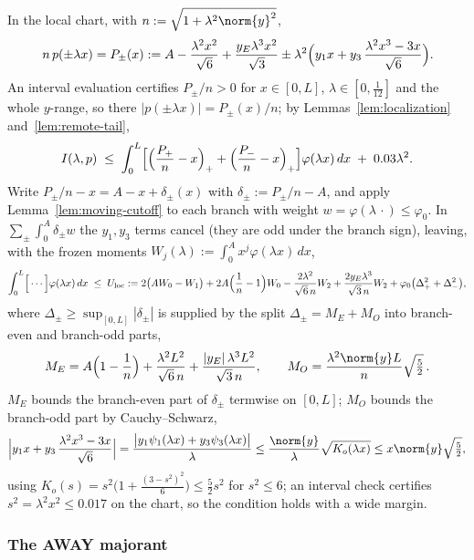 In the local chart, with $n:=\sqrt{1+\lambda^2\norm{y}^2}$,
\[
        n\,p(\pm\lambda x)=P_\pm(x)
        :=A-\frac{\lambda^2x^2}{\sqrt6}+\frac{y_E\lambda^3x^2}{\sqrt3}
        \pm\lambda^2\Bigl(y_1x+y_3\,\frac{\lambda^2x^3-3x}{\sqrt6}\Bigr).
\]
An interval evaluation certifies $P_\pm/n>0$ for $x\in[0,L]$, $\lambda\in[0,\tfrac1{12}]$ and the whole $y$-range, so there $|p(\pm\lambda x)|=P_\pm(x)/n$; by Lemmas~\ref{lem:localization} and~\ref{lem:remote-tail},
\begin{equation}
        I(\lambda,p)\;\le\;\int_0^L\Bigl[\Bigl(\frac{P_+}{n}-x\Bigr)_++\Bigl(\frac{P_-}{n}-x\Bigr)_+\Bigr]\varphi(\lambda x)\,dx
        \;+\;0.03\lambda^2 .
        \label{eq:reserve}
\end{equation}
Write $P_\pm/n-x=A-x+\delta_\pm(x)$ with $\delta_\pm:=P_\pm/n-A$, and apply Lemma~\ref{lem:moving-cutoff} to each branch with weight $w=\varphi(\lambda\,\cdot)\le\varphi_0$. In $\sum_\pm\int_0^A\delta_\pm w$ the $y_1,y_3$ terms cancel (they are odd under the branch sign), leaving, with the frozen moments $W_j(\lambda):=\int_0^Ax^j\varphi(\lambda x)\,dx$,
\[
        \int_0^L\Bigl[\,\cdots\Bigr]\varphi(\lambda x)\,dx
        \;\le\;U_{\mathrm{loc}}
        :=2\bigl(AW_0-W_1\bigr)+2A\Bigl(\frac1n-1\Bigr)W_0
        -\frac{2\lambda^2}{\sqrt6\,n}W_2+\frac{2y_E\lambda^3}{\sqrt3\,n}W_2
        +\varphi_0\bigl(\Delta_+^2+\Delta_-^2\bigr),
\]
where $\Delta_\pm\ge\sup_{[0,L]}|\delta_\pm|$ is supplied by the split $\Delta_\pm=M_E+M_O$ into branch-even and branch-odd parts,
\[
        M_E=A\Bigl(1-\frac1n\Bigr)+\frac{\lambda^2L^2}{\sqrt6\,n}+\frac{|y_E|\,\lambda^3L^2}{\sqrt3\,n},
        \qquad
        M_O=\frac{\lambda^2\norm{y}L}{n}\sqrt{\tfrac52}\,.
\]
$M_E$ bounds the branch-even part of $\delta_\pm$ termwise on $[0,L]$; $M_O$ bounds the branch-odd part by Cauchy--Schwarz,
\[
        \Bigl|y_1x+y_3\,\frac{\lambda^2x^3-3x}{\sqrt6}\Bigr|
        =\frac{\bigl|y_1\psi_1(\lambda x)+y_3\psi_3(\lambda x)\bigr|}{\lambda}
        \le\frac{\norm{y}}{\lambda}\sqrt{K_o(\lambda x)}
        \le x\norm{y}\sqrt{\tfrac52},
\]
using $K_o(s)=s^2\bigl(1+\tfrac{(3-s^2)^2}{6}\bigr)\le\tfrac52s^2$ for $s^2\le6$; an interval check certifies $s^2=\lambda^2x^2\le0.017$ on the chart, so the condition holds with a wide margin.

\subsubsection*{The AWAY majorant}

